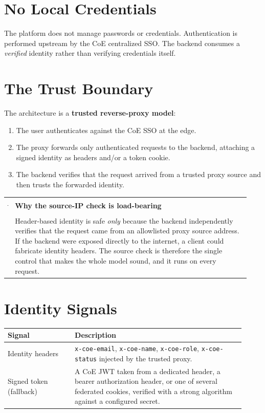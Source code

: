 \documentclass[12pt,a4paper,oneside]{report}
\makeatletter
\newcommand{\code}[1]{\texttt{#1}}
\newenvironment{callout}[1]{\par\vspace{4pt}\noindent
  \begin{tabular}{@{}p{0.014\linewidth}@{\hspace{0.6em}}p{0.93\linewidth}@{}}
  \textcolor{boxframe}{\rule{2pt}{\baselineskip}} & \textbf{\textcolor{tcetblue}{#1}}\\[2pt] & }{\end{tabular}\par\vspace{6pt}}
\makeatother
\begin{document}
\section{No Local Credentials}
The platform does not manage passwords or credentials. Authentication is
performed upstream by the CoE centralized SSO. The backend consumes a
\emph{verified} identity rather than verifying credentials itself.

\section{The Trust Boundary}
The architecture is a \textbf{trusted reverse-proxy model}:
\begin{enumerate}[leftmargin=1.6em]
  \item The user authenticates against the CoE SSO at the edge.
  \item The proxy forwards only authenticated requests to the backend, attaching
        a signed identity as headers and/or a token cookie.
  \item The backend verifies that the request arrived from a trusted proxy source
        and then trusts the forwarded identity.
\end{enumerate}

\begin{callout}{Why the source-IP check is load-bearing}
Header-based identity is safe \emph{only} because the backend independently
verifies that the request came from an allowlisted proxy source address. If the
backend were exposed directly to the internet, a client could fabricate identity
headers. The source check is therefore the single control that makes the whole
model sound, and it runs on every request.
\end{callout}

\section{Identity Signals}
\begin{longtable}{@{}p{0.26\linewidth} p{0.66\linewidth}@{}}
\toprule
\textbf{Signal} & \textbf{Description}\\
\midrule
\endhead
Identity headers & \code{x-coe-email}, \code{x-coe-name}, \code{x-coe-role}, \code{x-coe-status} injected by the trusted proxy.\\
Signed token (fallback) & A CoE JWT taken from a dedicated header, a bearer authorization header, or one of several federated cookies, verified with a strong algorithm against a configured secret.\\
\bottomrule
\end{longtable}
\end{document}
